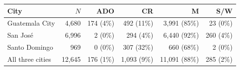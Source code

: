 \begin{tabular}{lrrrrr}
\toprule
City & $N$ & ADO & CR & M & S/W \\
\midrule
Guatemala City & 4{,}680 & 174 (4\%) & 492 (11\%) & 3{,}991 (85\%) & 23 (0\%) \\
San Jos\'e & 6{,}996 & 2 (0\%) & 294 (4\%) & 6{,}440 (92\%) & 260 (4\%) \\
Santo Domingo & 969 & 0 (0\%) & 307 (32\%) & 660 (68\%) & 2 (0\%) \\
\midrule
All three cities & 12{,}645 & 176 (1\%) & 1{,}093 (9\%) & 11{,}091 (88\%) & 285 (2\%) \\
\bottomrule
\end{tabular}
